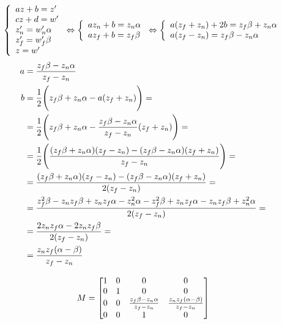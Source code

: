 \[
    \left\{
    \begin{array}{l}
        az + b = z' \\
        cz + d = w' \\
        z'_n = w'_n \alpha \\
        z'_f = w'_f \beta \\
        z = w' \\
    \end{array}
    \right.
    \Leftrightarrow
    \left\{
    \begin{array}{l}
        az_n + b = z_n \alpha \\
        az_f + b = z_f \beta \\
    \end{array}
    \right.
    \Leftrightarrow
    \left\{
    \begin{array}{l}
        a(z_f + z_n) + 2b = z_f \beta + z_n \alpha \\
        a(z_f - z_n) = z_f \beta - z_n \alpha \\
    \end{array}
    \right.
\]
\begin{align*}
    a & = \frac{z_f \beta - z_n \alpha}{z_f - z_n} \\
    b
    & = \frac{1}{2} \Biggl( z_f \beta + z_n \alpha - a(z_f + z_n) \Biggr) = \\
    & = \frac{1}{2} \Biggl( z_f \beta + z_n \alpha - \frac{z_f \beta - z_n \alpha}{z_f - z_n} (z_f + z_n) \Biggr) = \\
    & = \frac{1}{2} \Biggl( \frac{(z_f \beta + z_n \alpha) (z_f - z_n) - (z_f \beta - z_n \alpha) (z_f + z_n)}{z_f - z_n} \Biggr) = \\
    & = \frac{(z_f \beta + z_n \alpha) (z_f - z_n) - (z_f \beta - z_n \alpha) (z_f + z_n)}{2(z_f - z_n)} = \\
    & = \frac{z_f^2 \beta - z_n z_f \beta + z_n z_f \alpha - z_n^2 \alpha - z_f^2 \beta + z_n z_f \alpha - z_n z_f \beta + z_n^2 \alpha}{2(z_f - z_n)} = \\
    & = \frac{2 z_n z_f \alpha - 2 z_n z_f \beta}{2(z_f - z_n)} = \\
    & = \frac{z_n z_f (\alpha - \beta)}{z_f - z_n} \\
\end{align*}

\[
    M =
    \begin{bmatrix}
        1 & 0 & 0 & 0 \\
        0 & 1 & 0 & 0 \\
        0 & 0 & \frac{z_f \beta - z_n \alpha}{z_f - z_n} & \frac{z_n z_f (\alpha - \beta)}{z_f - z_n} \\
        0 & 0 & 1 & 0 \\
    \end{bmatrix}
\]
